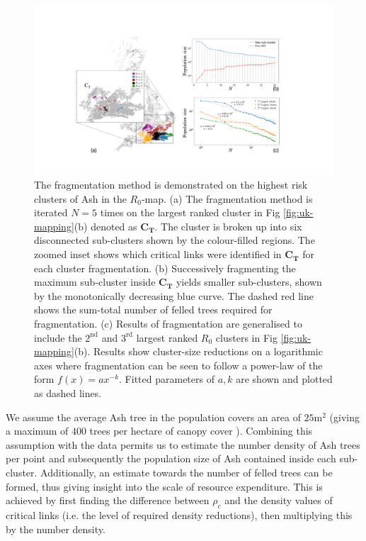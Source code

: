 \begin{figure}
\hfill
\centering
\includegraphics[scale=0.325]{chapter5/figures/figure5.pdf}
\caption{The fragmentation method is demonstrated on the highest risk clusters of Ash in the $R_0$-map. (a) The fragmentation method is iterated $N=5$ times on the largest ranked cluster in Fig \ref{fig:uk-mapping}(b) denoted as $\mathbf{C_T}$. The cluster is broken up into six disconnected sub-clusters shown by the colour-filled regions. The zoomed inset shows which critical links were identified in $\mathbf{C_T}$ for each cluster fragmentation. (b) Successively fragmenting the maximum sub-cluster inside $\mathbf{C_T}$ yields smaller sub-clusters, shown by the monotonically decreasing blue curve. The dashed red line shows the sum-total number of felled trees required for fragmentation. (c) Results of fragmentation are generalised to include the $\mathrm{2^{nd}}$ and $\mathrm{3^{rd}}$ largest ranked $R_0$ clusters in Fig \ref{fig:uk-mapping}(b). Results show cluster-size reductions on a logarithmic axes where fragmentation can be seen to follow a power-law of the form $f(x) = ax^{-k}$. Fitted parameters of $a,k$ are shown and plotted as dashed lines.}
\label{fig:result-cluster-reductions}
\end{figure}

We assume the average Ash tree in the population covers an area of $\mathrm{25m^2}$ (giving a maximum of $400$ trees per hectare of canopy cover \cite{ash-tree2, ash-tree1}). Combining this assumption with the data permits us to estimate the number density of Ash trees per point and subsequently the population size of Ash contained inside each sub-cluster. Additionally, an estimate towards the number of felled trees can be formed, thus giving insight into the scale of resource expenditure. This is achieved by first finding the difference between $\rho_c$ and the density values of critical links (i.e. the level of required density reductions), then multiplying this by the number density.\\

